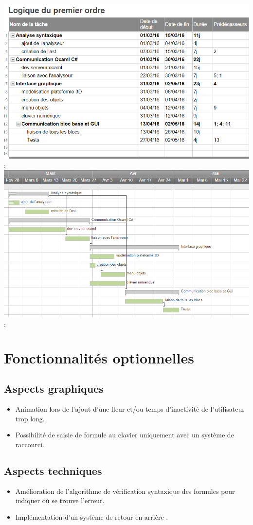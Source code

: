 \documentclass{article}
\theoremstyle{plain}
\theoremstyle{remark}
\begin{document}
\includegraphics{gantt1} ;
\includegraphics[scale=0.2]{gantt2} ;

\section{Fonctionnalités optionnelles}
\subsection{Aspects graphiques}
\begin{itemize}
\item Animation lors de l'ajout d'une fleur et/ou temps d'inactivité
  de l'utilisateur trop long.
\item Possibilité de saisie de formule au clavier uniquement avec un
  système de raccourci.
\end{itemize}
\subsection{Aspects techniques}
\begin{itemize}
\item Amélioration de l'algorithme de vérification syntaxique des formules
  pour indiquer où se trouve l'erreur.
\item Implémentation d'un système de \og retour en arrière \fg.
\end{itemize}
\end{document}
